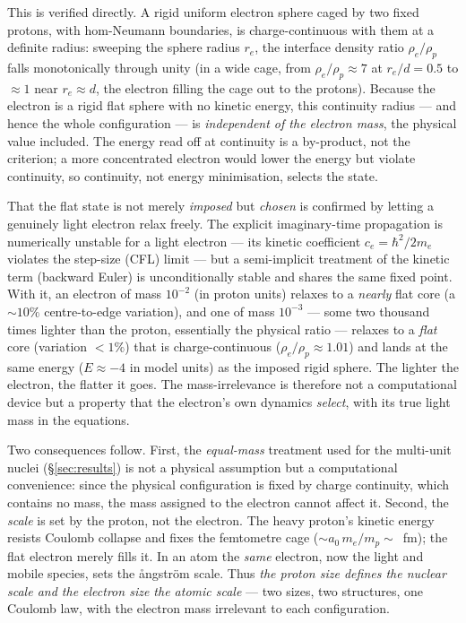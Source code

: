 \documentclass[11pt]{article}
\begin{document}
This is verified directly. A rigid uniform electron sphere caged by two fixed protons, with
hom-Neumann boundaries, is charge-continuous with them at a definite radius: sweeping the sphere radius
$r_e$, the interface density ratio $\rho_e/\rho_p$ falls monotonically through unity (in a wide cage,
from $\rho_e/\rho_p\approx7$ at $r_e/d=0.5$ to $\approx1$ near $r_e\approx d$, the electron filling the
cage out to the protons). Because the electron is a rigid flat sphere with no kinetic energy, this
continuity radius --- and hence the whole configuration --- is \emph{independent of the electron mass},
the physical value included. The energy read off at continuity is a by-product, not the criterion; a
more concentrated electron would lower the energy but violate continuity, so continuity, not energy
minimisation, selects the state.

That the flat state is not merely \emph{imposed} but \emph{chosen} is confirmed by letting a genuinely
light electron relax freely. The explicit imaginary-time propagation is numerically unstable for a light
electron --- its kinetic coefficient $c_e=\hbar^2/2m_e$ violates the step-size (CFL) limit --- but a
semi-implicit treatment of the kinetic term (backward Euler) is unconditionally stable and shares the
same fixed point. With it, an electron of mass $10^{-2}$ (in proton units) relaxes to a \emph{nearly}
flat core (a $\sim\!10\%$ centre-to-edge variation), and one of mass $10^{-3}$ --- some two thousand
times lighter than the proton, essentially the physical ratio --- relaxes to a \emph{flat} core
(variation $<1\%$) that is charge-continuous ($\rho_e/\rho_p\approx1.01$) and lands at the same energy
($E\approx-4$ in model units) as the imposed rigid sphere. The lighter the electron, the flatter it
goes. The mass-irrelevance is therefore not a computational device but a property that the electron's
own dynamics \emph{select}, with its true light mass in the equations.

Two consequences follow. First, the \emph{equal-mass} treatment used for the multi-unit nuclei
(\S\ref{sec:results}) is not a physical assumption but a computational convenience: since the physical
configuration is fixed by charge continuity, which contains no mass, the mass assigned to the electron
cannot affect it. Second, the \emph{scale} is set by the proton, not the electron. The heavy proton's
kinetic energy resists Coulomb collapse and fixes the femtometre cage ($\sim a_0\,m_e/m_p\sim$~fm); the
flat electron merely fills it. In an atom the \emph{same} electron, now the light and mobile species,
sets the {\aa}ngstr\"om scale. Thus \emph{the proton size defines the nuclear scale and the electron
size the atomic scale} --- two sizes, two structures, one Coulomb law, with the electron mass irrelevant
to each configuration.
\end{document}
